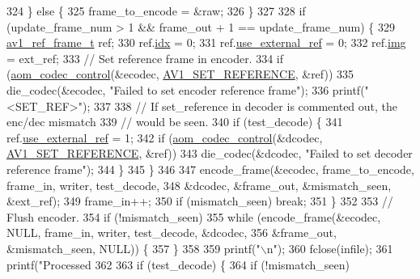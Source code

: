 \begin{DoxyCodeInclude}
{{{{{{{{{{324     \} \textcolor{keywordflow}{else} \{
325       frame\_to\_encode = &raw;
326     \}
327 
328     \textcolor{keywordflow}{if} (update\_frame\_num > 1 && frame\_out + 1 == update\_frame\_num) \{
329       \hyperlink{structav1__ref__frame}{av1\_ref\_frame\_t} ref;
330       ref.\hyperlink{structav1__ref__frame_a7c6fcaba58f514985448cb2e2245345c}{idx} = 0;
331       ref.\hyperlink{structav1__ref__frame_a33749c5c20033cc5f7582d0ec1c34ff0}{use\_external\_ref} = 0;
332       ref.\hyperlink{structav1__ref__frame_a55a09db9e1acdd73e656b01fa01283b3}{img} = ext\_ref;
333       \textcolor{comment}{// Set reference frame in encoder.}
334       \textcolor{keywordflow}{if} (\hyperlink{group__codec_ga6da974f4eeaba1fa74106b28d0fe6ac5}{aom\_codec\_control}(&ecodec, \hyperlink{group__aom_gga9421a1fa78c0d9587ae5aa6c1cb3d659a51ad4467b4dc318406cceb257e2daa41}{AV1\_SET\_REFERENCE}, &ref))
335         die\_codec(&ecodec, \textcolor{stringliteral}{"Failed to set encoder reference frame"});
336       printf(\textcolor{stringliteral}{" <SET\_REF>"});
337 
338       \textcolor{comment}{// If set\_reference in decoder is commented out, the enc/dec mismatch}
339       \textcolor{comment}{// would be seen.}
340       \textcolor{keywordflow}{if} (test\_decode) \{
341         ref.\hyperlink{structav1__ref__frame_a33749c5c20033cc5f7582d0ec1c34ff0}{use\_external\_ref} = 1;
342         \textcolor{keywordflow}{if} (\hyperlink{group__codec_ga6da974f4eeaba1fa74106b28d0fe6ac5}{aom\_codec\_control}(&dcodec, \hyperlink{group__aom_gga9421a1fa78c0d9587ae5aa6c1cb3d659a51ad4467b4dc318406cceb257e2daa41}{AV1\_SET\_REFERENCE}, &ref))
343           die\_codec(&dcodec, \textcolor{stringliteral}{"Failed to set decoder reference frame"});
344       \}
345     \}
346 
347     encode\_frame(&ecodec, frame\_to\_encode, frame\_in, writer, test\_decode,
348                  &dcodec, &frame\_out, &mismatch\_seen, &ext\_ref);
349     frame\_in++;
350     \textcolor{keywordflow}{if} (mismatch\_seen) \textcolor{keywordflow}{break};
351   \}
352 
353   \textcolor{comment}{// Flush encoder.}
354   \textcolor{keywordflow}{if} (!mismatch\_seen)
355     \textcolor{keywordflow}{while} (encode\_frame(&ecodec, NULL, frame\_in, writer, test\_decode, &dcodec,
356                         &frame\_out, &mismatch\_seen, NULL)) \{
357     \}
358 
359   printf(\textcolor{stringliteral}{"\(\backslash\)n"});
360   fclose(infile);
361   printf(\textcolor{stringliteral}{"Processed %
362 
363   \textcolor{keywordflow}{if} (test\_decode) \{
364     \textcolor{keywordflow}{if} (!mismatch\_seen)
}}}}}}}}}}}
\end{DoxyCodeInclude}
